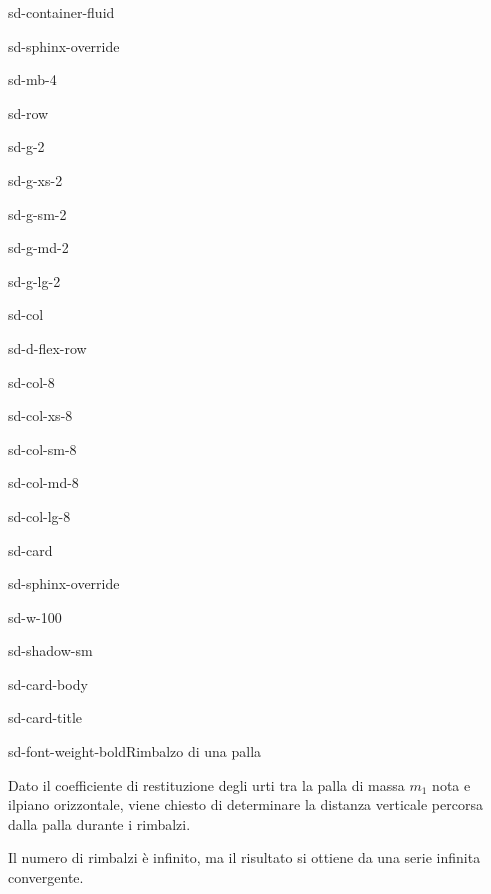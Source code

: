\documentclass[letterpaper,10pt,italian]{jupyterBook}
\begin{document}
\begin{sphinxuseclass}{sd-container-fluid}
\begin{sphinxuseclass}{sd-sphinx-override}
\begin{sphinxuseclass}{sd-mb-4}
\begin{sphinxuseclass}{sd-row}
\begin{sphinxuseclass}{sd-g-2}
\begin{sphinxuseclass}{sd-g-xs-2}
\begin{sphinxuseclass}{sd-g-sm-2}
\begin{sphinxuseclass}{sd-g-md-2}
\begin{sphinxuseclass}{sd-g-lg-2}
\begin{sphinxuseclass}{sd-col}
\begin{sphinxuseclass}{sd-d-flex-row}
\begin{sphinxuseclass}{sd-col-8}
\begin{sphinxuseclass}{sd-col-xs-8}
\begin{sphinxuseclass}{sd-col-sm-8}
\begin{sphinxuseclass}{sd-col-md-8}
\begin{sphinxuseclass}{sd-col-lg-8}
\begin{sphinxuseclass}{sd-card}
\begin{sphinxuseclass}{sd-sphinx-override}
\begin{sphinxuseclass}{sd-w-100}
\begin{sphinxuseclass}{sd-shadow-sm}
\begin{sphinxuseclass}{sd-card-body}
\begin{sphinxuseclass}{sd-card-title}
\begin{sphinxuseclass}{sd-font-weight-bold}Rimbalzo di una palla
\end{sphinxuseclass}
\end{sphinxuseclass}
\sphinxAtStartPar
Dato il coefficiente di restituzione degli urti tra la palla di massa \(m_1\) nota e ilpiano orizzontale, viene chiesto di determinare la distanza verticale percorsa dalla palla durante i rimbalzi.

\sphinxAtStartPar
{} Il numero di rimbalzi è infinito, ma il risultato si ottiene da una serie infinita convergente.


\end{sphinxuseclass}
\end{sphinxuseclass}
\end{sphinxuseclass}
\end{sphinxuseclass}
\end{sphinxuseclass}
\end{sphinxuseclass}
\end{sphinxuseclass}
\end{sphinxuseclass}
\end{sphinxuseclass}
\end{sphinxuseclass}
\end{sphinxuseclass}
\end{sphinxuseclass}
\end{sphinxuseclass}
\end{sphinxuseclass}
\end{sphinxuseclass}
\end{sphinxuseclass}
\end{sphinxuseclass}
\end{sphinxuseclass}
\end{sphinxuseclass}
\end{sphinxuseclass}
\end{sphinxuseclass}
\end{document}
